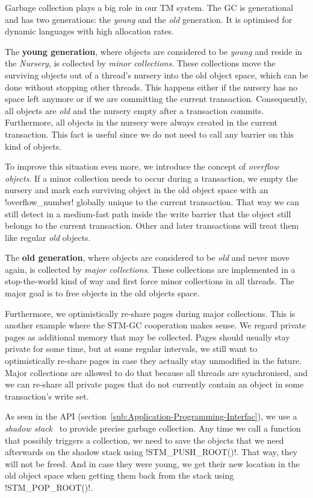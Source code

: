 \documentclass{sigplanconf}
\makeatletter
\renewcommand\lstinline[1][]{%
  \Collectverb{\@@myverb}%
}
\def\@@myverb#1{%
    \begingroup
    \fboxsep=0.2em
    \colorbox{verylightgray}{\oldlstinline|#1|}%
    \endgroup
}
\makeatother
\begin{document}
Garbage collection plays a big role in our TM system. The GC is
generational and has two generations: the \emph{young} and the
\emph{old} generation. It is optimised for dynamic languages with
high allocation rates.

The \textbf{young generation}, where objects are considered to be
\emph{young} and reside in the \emph{Nursery}, is collected by
\emph{minor collections}. These collections move the surviving objects
out of a thread's nursery into the old object space, which can be done
without stopping other threads. This happens either if the nursery has
no space left anymore or if we are committing the current
transaction. Consequently, all objects are \emph{old} and the nursery empty
after a transaction commits.  Furthermore, all objects in the nursery
were always created in the current transaction. This fact is useful
since we do not need to call any barrier on this kind of objects.

To improve this situation even more, we introduce the concept of
\emph{overflow objects}. If a minor collection needs to occur during a
transaction, we empty the nursery and mark each surviving object in
the old object space with an \lstinline!overflow_number!  globally
unique to the current transaction. That way we can still detect in a
medium-fast path inside the write barrier that the object still belongs to the
current transaction. Other and later transactions will treat them
like regular \emph{old} objects.

The \textbf{old generation}, where objects are considered to be
\emph{old} and never move again, is collected by \emph{major
  collections}.  These collections are implemented in a stop-the-world
kind of way and first force minor collections in all threads. The
major goal is to free objects in the old objects space.

Furthermore, we optimistically re-share pages during major collections.
This is another example where the STM-GC cooperation makes sense. We
regard private pages as additional memory that may be collected.
Pages should usually stay private for some time, but at some regular
intervals, we still want to optimistically re-share pages in case they actually
stay unmodified in the future. Major collections are allowed to do
that because all threads are synchronised, and we can re-share all
private pages that do not currently contain an object in some
transaction's  write set.

As seen in the API (section~\ref{sub:Application-Programming-Interfac}),
we use a \emph{shadow stack}~\cite{fergus02} to provide precise garbage
collection.  Any time we call a function that possibly triggers a
collection, we need to save the objects that we need afterwards on the
shadow stack using \lstinline!STM_PUSH_ROOT()!.  That way, they will
not be freed. And in case they were young, we get their new location
in the old object space when getting them back from the stack using
\lstinline!STM_POP_ROOT()!.
\end{document}
